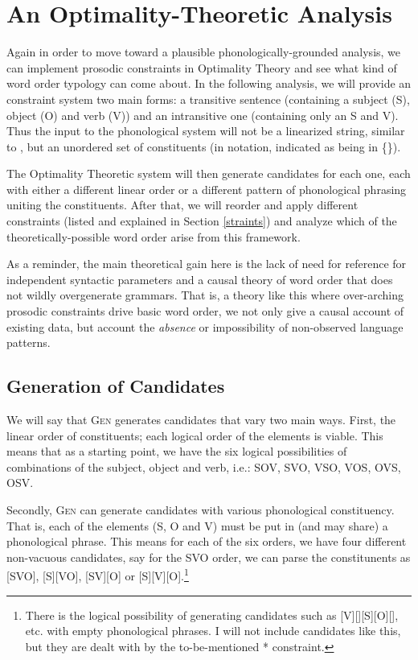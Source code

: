 \documentclass{article}
\newcommand{\nophi}{\textsc{*\textphi}}
\begin{document}
\section{An Optimality-Theoretic Analysis\label{otanal}}

Again in order to move toward a plausible phonologically-grounded analysis, we can implement prosodic constraints in Optimality Theory \parencite{prince93} and see what kind of word order typology can come about.
In the following analysis, we will provide an constraint system two main forms: a transitive sentence (containing a subject (S), object (O) and verb (V)) and an intransitive one (containing only an S and V).
Thus the input to the phonological system will not be a linearized string, similar to \textcite{halle87}, but an unordered set of constituents (in notation, indicated as being in \{\}).

The Optimality Theoretic system will then generate candidates for each one, each with either a different linear order or a different pattern of phonological phrasing uniting the constituents.
After that, we will reorder and apply different constraints (listed and explained in Section \ref{straints}) and analyze which of the theoretically-possible word order arise from this framework.

As a reminder, the main theoretical gain here is the lack of need for reference for independent syntactic parameters and a causal theory of word order that does not wildly overgenerate grammars.
That is, a theory like this where over-arching prosodic constraints drive basic word order, we not only give a causal account of existing data, but account the \emph{absence} or impossibility of non-observed language patterns.

\subsection{Generation of Candidates\label{generation}}

We will say that \textsc{Gen} generates candidates that vary two main ways.
First, the linear order of constituents; each logical order of the elements is viable.
This means that as a starting point, we have the six logical possibilities of combinations of the subject, object and verb, i.e.: SOV, SVO, VSO, VOS, OVS, OSV.

Secondly, \textsc{Gen} can generate candidates with various phonological constituency.
That is, each of the elements (S, O and V) must be put in (and may share) a phonological phrase.
This means for each of the six orders, we have four different non-vacuous candidates, say for the SVO order, we can parse the constitunents as [SVO], [S][VO], [SV][O] or [S][V][O].\footnote{There is the logical possibility of generating candidates such as [V][][S][O][], etc. with empty phonological phrases. I will not include candidates like this, but they are dealt with by the to-be-mentioned {\nophi} constraint.}
\end{document}
